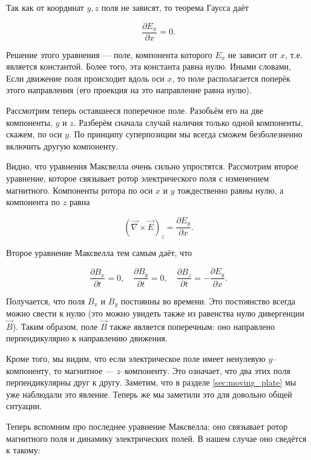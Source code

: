 \documentclass[11pt,a4paper]{article}
\numberwithin{equation}{section}
\newcommand{\pt}{\partial}
\newcommand{\vn}{\vec{\nabla}}
\begin{document}
Так как от координат $y,z$ поля не зависят, то теорема Гаусса даёт

\begin{equation}
  \label{eq:waves_1}
  \frac{\pt E_x}{\pt x}=0.
\end{equation}

Решение этого уравнения --- поле, компонента которого $E_x$ не зависит
от $x$, т.е. является константой. Более того, эта константа равна
нулю. Иными словами, Если движение поля происходит вдоль оси $x$, то
поле располагается поперёк этого направления (его проекция на это
направление равна нулю). 

Рассмотрим теперь оставшееся поперечное поле. Разобьём его на две
компоненты, $y$ и $z$. Разберём сначала случай наличия только одной
компоненты, скажем, по оси $y$. По принципу суперпозиции мы всегда
сможем безболезненно включить другую компоненту. 

Видно, что уравнения Максвелла очень сильно упростятся. Рассмотрим
второе уравнение, которое связывает ротор электрического поля с
изменением магнитного. Компоненты ротора по оси $x$ и $y$ тождественно
равны нулю, а компонента по $z$ равна

\begin{equation}
  \label{eq:waves_2}
  \left(\vn \times \vec{E}  \right)_z = \frac{\pt E_y}{\pt x}.
\end{equation}

Второе уравнение Максвелла тем самым даёт, что

\begin{equation}
  \label{eq:waves_3}
  \frac{\pt B_x}{\pt t} = 0, \quad   \frac{\pt B_y}{\pt t} = 0, \quad
  \frac{\pt B_z}{\pt t} = - \frac{\pt E_y}{\pt x}.
\end{equation}

Получается, что поля $B_x$ и $B_y$ постоянны во времени. Это
постоянство всегда можно свести к нулю (это можно увидеть также из
равенства нулю дивергенции $\vec{B}$). Таким образом, поле $\vec{B}$
также является поперечным: оно направлено перпендикулярно к
направлению движения. 

Кроме того, мы видим, что если электрическое поле имеет ненулевую
$y$--компоненту, то магнитное --- $z$--компоненту. Это означает, что
два этих поля перпендикулярны друг к другу. Заметим, что в разделе
\ref{sec:moving_plate} мы уже наблюдали это явление. Теперь же мы
заметили это для довольно общей ситуации. 

Теперь вспомним про последнее уравнение Максвелла; оно связывает ротор
магнитного поля и динамику электрических полей. В нашем случае оно
сведётся к такому: 
\end{document}

